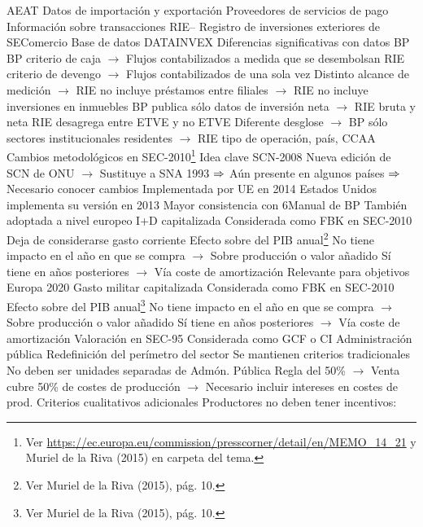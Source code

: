 \documentclass{nuevotema}
\begin{document}
\begin{esquemal}
			\3 AEAT
				\4 Datos de importación y exportación
			\3 Proveedores de servicios de pago
				\4 Información sobre transacciones
			\3 RIE-- Registro de inversiones exteriores de SEComercio
				\4 Base de datos DATAINVEX
				\4 Diferencias significativas con datos BP
				\4[] BP criterio de caja
				\4[] $\to$ Flujos contabilizados a medida que se desembolsan
				\4[] RIE criterio de devengo
				\4[] $\to$ Flujos contabilizados de una sola vez
				\4[] Distinto alcance de medición
				\4[] $\to$ RIE no incluye préstamos entre filiales
				\4[] $\to$ RIE no incluye inversiones en inmuebles
				\4[] BP publica sólo datos de inversión neta
				\4[] $\to$ RIE bruta y neta
				\4[] RIE desagrega entre ETVE y no ETVE
				\4[] Diferente desglose
				\4[] $\to$ BP sólo sectores institucionales residentes
				\4[] $\to$ RIE tipo de operación, país, CCAA
		\2 Cambios metodológicos en SEC-2010\footnote{Ver \url{https://ec.europa.eu/commission/presscorner/detail/en/MEMO_14_21} y Muriel de la Riva (2015) en carpeta del tema.}
			\3 Idea clave
				\4 SCN-2008
				\4[] Nueva edición de SCN de ONU
				\4[] $\to$ Sustituye a SNA 1993
				\4[] $\Rightarrow$ Aún presente en algunos países
				\4[] $\Rightarrow$ Necesario conocer cambios
				\4 Implementada por UE en 2014
				\4 Estados Unidos implementa su versión en 2013
				\4 Mayor consistencia con 6Manual de BP
				\4[] También adoptada a nivel europeo
			\3 I+D capitalizada
				\4 Considerada como FBK en SEC-2010
				\4 Deja de considerarse gasto corriente
				\4 Efecto sobre del PIB anual\footnote{Ver Muriel de la Riva (2015), pág. 10.}
				\4[] No tiene impacto en el año en que se compra
				\4[] $\to$ Sobre producción o valor añadido
				\4[] Sí tiene en años posteriores
				\4[] $\to$ Vía coste de amortización
				\4 Relevante para objetivos Europa 2020
			\3 Gasto militar capitalizada
				\4 Considerada como FBK en SEC-2010
				\4 Efecto sobre del PIB anual\footnote{Ver Muriel de la Riva (2015), pág. 10.}
				\4[] No tiene impacto en el año en que se compra
				\4[] $\to$ Sobre producción o valor añadido
				\4[] Sí tiene en años posteriores
				\4[] $\to$ Vía coste de amortización
				\4 Valoración en SEC-95
				\4[] Considerada como GCF o CI
			\3 Administración pública
				\4 Redefinición del perímetro del sector
				\4 Se mantienen criterios tradicionales
				\4[] No deben ser unidades separadas de Admón. Pública
				\4[] Regla del 50\%
				\4[] $\to$ Venta cubre 50\% de costes de producción
				\4[] $\to$ Necesario incluir intereses en costes de prod.
				\4 Criterios cualitativos adicionales
				\4[] Productores no deben tener incentivos:

\end{esquemal}
\end{document}
